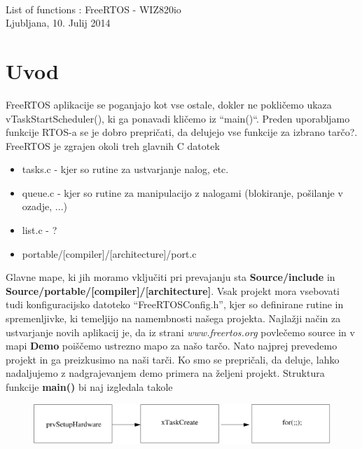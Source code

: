 \documentclass[12pt]{article}
\begin{document}
 
	
\begin{titlepage}
\begin{center}


\lstset{
numbers=left, 
numberstyle=\small, 
numbersep=8pt, 
frame = single, 
language=Pascal, 
framexleftmargin=15pt}

~\\[8cm]

{\LARGE List of functions : FreeRTOS - WIZ820io}\\[1cm]


\vfill
Ljubljana, 10. Julij 2014\\[2.7cm]



\end{center}
\end{titlepage}

\section{Uvod}
FreeRTOS aplikacije se poganjajo kot vse ostale, dokler ne pokličemo ukaza vTaskStartScheduler(), ki ga ponavadi kličemo iz “main()“. Preden uporabljamo funkcije RTOS-a se je dobro prepričati, da delujejo vse funkcije za izbrano tarčo?. FreeRTOS je zgrajen okoli treh glavnih C datotek 
\begin{itemize}
	\item tasks.c - kjer so rutine za ustvarjanje nalog, etc. 
	\item queue.c - kjer so rutine za manipulacijo z nalogami (blokiranje, pošilanje v ozadje, ...)
	\item list.c - ?
	\item portable/[compiler]/[architecture]/port.c  
\end{itemize}
Glavne mape, ki jih moramo vključiti pri prevajanju sta \textbf{Source/include} in \textbf{Source/portable/[compiler]/[architecture]}. Vsak projekt mora vsebovati tudi konfiguracijsko datoteko “FreeRTOSConfig.h”, kjer so definirane rutine in spremenljivke, ki temeljijo na namembnosti našega projekta. 
Najlažji način za ustvarjanje novih aplikacij je, da iz strani \textit{www.freertos.org} povlečemo source in v mapi \textbf{Demo} poiščemo ustrezno mapo za našo tarčo. Nato najprej prevedemo projekt in ga preizkusimo na naši tarči. Ko smo se prepričali, da deluje, lahko nadaljujemo z nadgrajevanjem demo primera na željeni projekt. \newline
Struktura funkcije \textbf{main()} bi naj izgledala takole
\begin{figure}[h]
 \includegraphics[scale=0.6]{main.pdf}
\end{figure}
\end{document}

